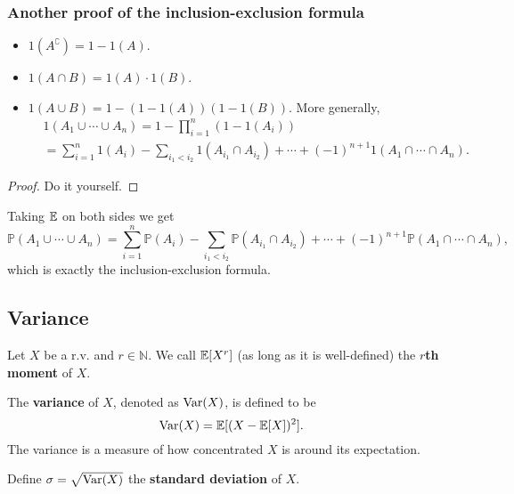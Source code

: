 \subsubsection*{Another proof of the inclusion-exclusion formula}
\begin{proposition}
    \begin{itemize}
        \item $ 1(A^\complement) = 1-1(A) $.
        \item $ 1(A \cap B) = 1(A)\cdot 1(B) $.
        \item $ 1(A \cup B) = 1-(1-1(A))(1-1(B)) $. More generally,
        \begin{align*}
            &1(A_1\cup \cdots \cup A_n) = 1-\prod_{i=1}^{n}(1-1(A_i))\\ 
            &= \sum_{i=1}^{n}1(A_i) -\sum_{i_1<i_2} 1(A_{i_1}\cap A_{i_2})+\cdots+(-1)^{n+1}1(A_1\cap \cdots\cap A_n).
        \end{align*}
    \end{itemize}
\end{proposition}
\begin{proof}
    Do it yourself.
\end{proof}
Taking ${\mathbb{E}}$ on both sides we get 
\[
    \mathbb{P}{(A_1\cup\cdots\cup A_n)} = \sum_{i=1}^{n}\mathbb{P}(A_i)-\sum_{i_1<i_2} \mathbb{P}(A_{i_1}\cap A_{i_2})+\cdots+(-1)^{n+1}\mathbb{P}(A_1\cap\cdots\cap A_n),
\]
which is exactly the inclusion-exclusion formula.

\subsection{Variance}
\begin{definition}
    Let $X$ be a r.v. and $ r\in \mathbb{N} $. We call $ {\mathbb{E}}[X^r] $ (as long as it is well-defined) the \textbf{$r$th moment} of $X$.
\end{definition}
\begin{definition}
    The \textbf{variance} of $X$, denoted as $ \operatorname{Var}(X) $, is defined to be 
    \[
        \operatorname{Var}(X) = {\mathbb{E}}[(X-{\mathbb{E}}[X])^2].
    \]
    The variance is a measure of how concentrated $X$ is around its expectation.

    Define $ \sigma=\sqrt{\operatorname{Var}(X)} $ the \textbf{standard deviation} of $X$.
\end{definition}
